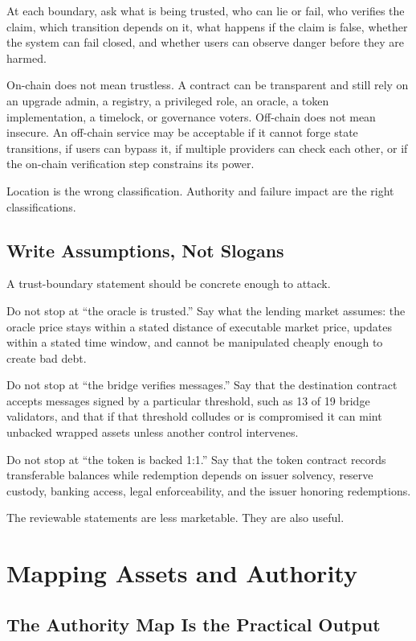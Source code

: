 At each boundary, ask what is being trusted, who can lie or fail, who verifies the claim, which transition depends on it, what happens if the claim is false, whether the system can fail closed, and whether users can observe danger before they are harmed.

On-chain does not mean trustless. A contract can be transparent and still rely on an upgrade admin, a registry, a privileged role, an oracle, a token implementation, a timelock, or governance voters. Off-chain does not mean insecure. An off-chain service may be acceptable if it cannot forge state transitions, if users can bypass it, if multiple providers can check each other, or if the on-chain verification step constrains its power.

Location is the wrong classification. Authority and failure impact are the right classifications.

\subsection{Write Assumptions, Not Slogans}

A trust-boundary statement should be concrete enough to attack.

Do not stop at ``the oracle is trusted.'' Say what the lending market assumes: the oracle price stays within a stated distance of executable market price, updates within a stated time window, and cannot be manipulated cheaply enough to create bad debt.

Do not stop at ``the bridge verifies messages.'' Say that the destination contract accepts messages signed by a particular threshold, such as 13 of 19 bridge validators, and that if that threshold colludes or is compromised it can mint unbacked wrapped assets unless another control intervenes.

Do not stop at ``the token is backed 1:1.'' Say that the token contract records transferable balances while redemption depends on issuer solvency, reserve custody, banking access, legal enforceability, and the issuer honoring redemptions.

The reviewable statements are less marketable. They are also useful.

\section{Mapping Assets and Authority}

\subsection{The Authority Map Is the Practical Output}

